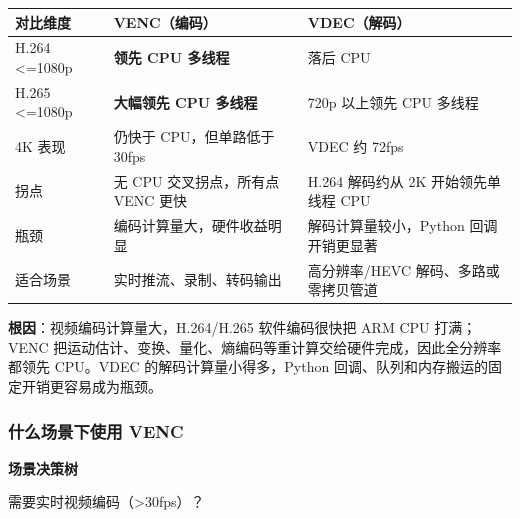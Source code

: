 \begin{longtable}[]{@{}
  >{\raggedright\arraybackslash}p{}
  >{\raggedright\arraybackslash}p{}
  >{\raggedright\arraybackslash}p{}@{}}
\toprule\noalign{}
\begin{minipage}[b]{\linewidth}\raggedright
对比维度
\end{minipage} & \begin{minipage}[b]{\linewidth}\raggedright
VENC（编码）
\end{minipage} & \begin{minipage}[b]{\linewidth}\raggedright
VDEC（解码）
\end{minipage} \\
\midrule\noalign{}
\endhead
\bottomrule\noalign{}
\endlastfoot
H.264 \textless=1080p & \textbf{领先 CPU 多线程} & 落后 CPU \\
H.265 \textless=1080p & \textbf{大幅领先 CPU 多线程} & 720p 以上领先 CPU
多线程 \\
4K 表现 & 仍快于 CPU，但单路低于 30fps & VDEC 约 72fps \\
拐点 & 无 CPU 交叉拐点，所有点 VENC 更快 & H.264 解码约从 2K
开始领先单线程 CPU \\
瓶颈 & 编码计算量大，硬件收益明显 & 解码计算量较小，Python
回调开销更显著 \\
适合场景 & 实时推流、录制、转码输出 & 高分辨率/HEVC
解码、多路或零拷贝管道 \\
\end{longtable}

\textbf{根因}：视频编码计算量大，H.264/H.265 软件编码很快把 ARM CPU
打满；VENC
把运动估计、变换、量化、熵编码等重计算交给硬件完成，因此全分辨率都领先
CPU。VDEC 的解码计算量小得多，Python
回调、队列和内存搬运的固定开销更容易成为瓶颈。

\subsubsection{什么场景下使用 VENC}\label{src-book-chapter6-h45}

\textbf{场景决策树}

需要实时视频编码（\textgreater30fps）？

